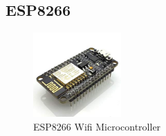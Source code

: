       
        
        \subsection{ESP8266}
        \begin{figure}
        	\includegraphics[width=0.3\textwidth]{photos/theory/esp8266.jpg}
        	\caption{ESP8266 Wifi Microcontroller}
        \end{figure}
    
